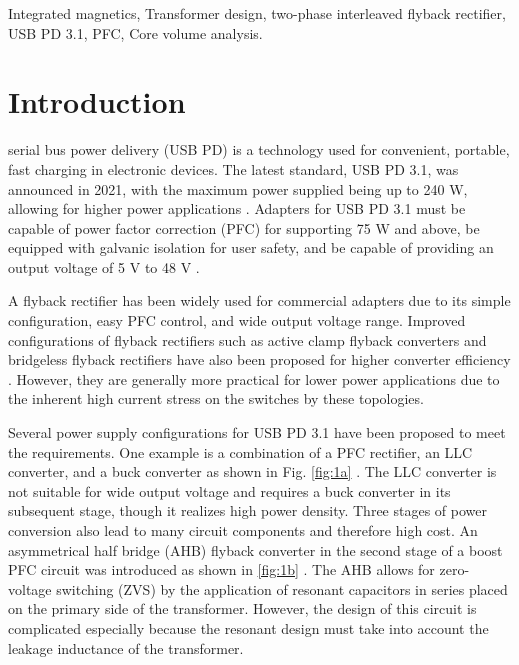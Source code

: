 \documentclass[lettersize,journal]{IEEEtran}
\begin{document}
\begin{IEEEkeywords}
Integrated magnetics, Transformer design, two-phase interleaved flyback rectifier, USB PD 3.1, PFC, Core volume analysis.
\end{IEEEkeywords}

\section{Introduction}
 serial bus power delivery (USB PD) is a technology used for convenient, portable, fast charging in electronic devices. The latest standard, USB PD 3.1, was announced in 2021, with the maximum power supplied being up to 240 W, allowing for higher power applications \cite{ref1}. Adapters for USB PD 3.1 must be capable of power factor correction (PFC) for supporting 75 W and above, be equipped with galvanic isolation for user safety, and be capable of providing an output voltage of 5 V to 48 V \cite{ref2}.

A flyback rectifier has been widely used for commercial adapters due to its simple configuration, easy PFC control, and wide output voltage range. Improved configurations of flyback rectifiers such as active clamp flyback converters \cite{ref6, ref7} and bridgeless flyback rectifiers have also been proposed for higher converter efficiency \cite{ref8, ref9, ref10, ref11}. However, they are generally more practical for lower power applications due to the inherent high current stress on the switches by these topologies.

Several power supply configurations for USB PD 3.1 have been proposed to meet the requirements. One example is a combination of a PFC rectifier, an LLC converter, and a buck converter as shown in Fig. \ref{fig:1a} \cite{ref3, ref4}. The LLC converter is not suitable for wide output voltage and requires a buck converter in its subsequent stage, though it realizes high power density. Three stages of power conversion also lead to many circuit components and therefore high cost. An asymmetrical half bridge (AHB) flyback converter in the second stage of a boost PFC circuit was introduced as shown in \ref{fig:1b} \cite{ref5}. The AHB allows for zero-voltage switching (ZVS) by the application of resonant capacitors in series placed on the primary side of the transformer. However, the design of this circuit is complicated especially because the resonant design must take into account the leakage inductance of the transformer.
\end{document}
